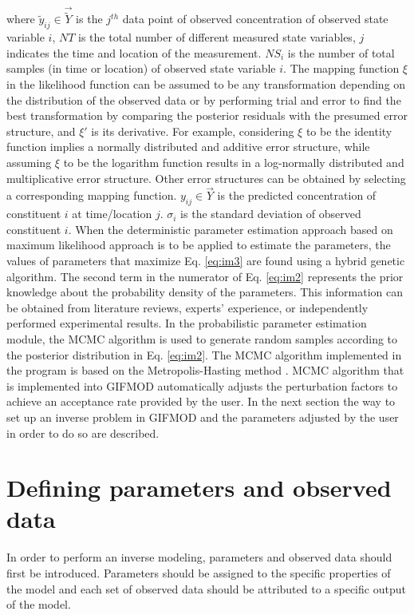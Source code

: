 where $\tilde y_{ij}\in \vec{\tilde Y}$ is the $j^{th}$ data point of observed concentration of observed state variable $i$, $NT$ is the total number of different measured state variables, $j$ indicates the time and location of the measurement. $NS_i$ is the number of total samples (in time or location) of observed state variable $i$. The mapping function $\xi$ in the likelihood function can be assumed to be any transformation depending on the distribution of the observed data or by performing trial and error to find the best transformation by comparing the posterior residuals with the presumed error structure, and $\xi'$ is its derivative. For example, considering $\xi$ to be the identity function implies a normally distributed and additive error structure, while assuming $\xi$ to be the logarithm function results in a log-normally distributed and multiplicative error structure. Other error structures can be obtained by selecting a corresponding mapping function. $y_{ij}\in \vec{Y}$  is the predicted concentration of constituent $i$ at time/location $j$. $\sigma_i$ is the standard deviation of observed constituent $i$. When the deterministic parameter estimation approach based on maximum likelihood approach is to be applied to estimate the parameters, the values of parameters that maximize Eq. \ref{eq:im3} \citep{montgomery2010} are found  using a hybrid genetic algorithm. 
The second term in the numerator of Eq. \ref{eq:im2} represents the prior knowledge about the probability density of the parameters. This information can be obtained from literature reviews, experts’ experience, or independently performed experimental results.
In the probabilistic parameter estimation module, the MCMC algorithm \citep{gamerman2006} is used to generate random samples according to the posterior distribution in Eq. \ref{eq:im2}. The MCMC algorithm implemented in the program is based on the Metropolis-Hasting method \citep{metropolis1953}. MCMC algorithm that is implemented into GIFMOD automatically adjusts the perturbation factors to achieve an acceptance rate provided by the user. In the next section the way to set up an inverse problem in GIFMOD and the parameters adjusted by the user in order to do so are described.  
\section{Defining parameters and observed data}
In order to perform an inverse modeling, parameters and observed data should first be introduced. Parameters should be assigned to the specific properties of the model and each set of observed data should be attributed to a specific output of the model. 
